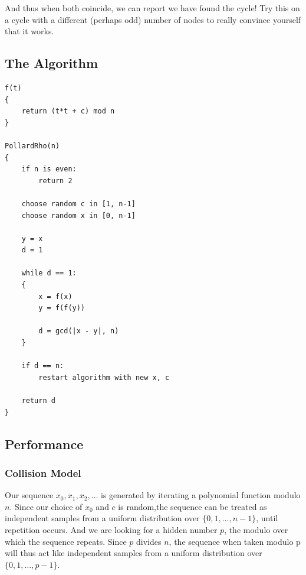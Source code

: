 And thus when both coincide, we can report we have found the cycle! Try this on a 
cycle with a different (perhaps odd) number of nodes to really convince yourself that it works. 

\subsection{The Algorithm}
\begin{center}
\begin{minipage}{0.9\linewidth}
\begin{framed}
\begin{Verbatim}
f(t)
{
    return (t*t + c) mod n
}

PollardRho(n)
{
    if n is even:
        return 2

    choose random c in [1, n-1]
    choose random x in [0, n-1]

    y = x
    d = 1

    while d == 1:
    {
        x = f(x)
        y = f(f(y))

        d = gcd(|x - y|, n)
    }

    if d == n:
        restart algorithm with new x, c

    return d
}
\end{Verbatim}
\vspace{-4mm}
\end{framed}
\end{minipage}
\end{center}


\subsection{Performance}

\subsubsection{Collision Model}

Our sequence $x_0,x_1,x_2,\dots$ is generated by iterating a polynomial function modulo \(n\).
Since our choice of $x_0$ and $c$ is random,the sequence can be treated as independent samples from a 
uniform distribution over \(\{0,1,\dots,n-1\}\), until repetition occurs. And we are looking for a 
hidden number $p$, the modulo over which the sequence repeats. Since $p$ divides \(n\), the sequence 
when taken modulo p will thus act like independent samples from a uniform distribution over \(\{0,1,\dots,p-1\}\).\\

